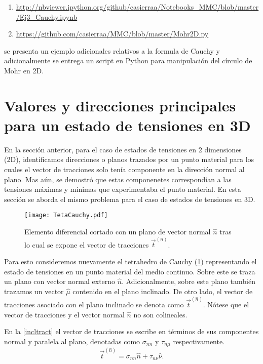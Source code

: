 \documentclass[../notas medios.tex]{subfiles}
\begin{document}
\begin{enumerate} 
\item {\url{http://nbviewer.ipython.org/github/casierraa/Notebooks_MMC/blob/master/Ej3_Cauchy.ipynb}}

\item  {\url{https://github.com/casierraa/MMC/blob/master/Mohr2D.py}} 
\end{enumerate}

se presenta un ejemplo adicionales relativos a la formula de Cauchy y  adicionalmente se entrega un script en Python para manipulación del círculo de Mohr en 2D.

\section{Valores y direcciones principales para un estado de tensiones en 3D}
En la sección anterior, para el caso de estados de tensiones en 2 dimensiones (2D), identificamos direcciones o planos trazados por un punto material para los cuales el vector de tracciones solo tenía componente en la dirección normal al plano. Mas aún, se demostró que estas componenetes correspondían a las tensiones máximas y mínimas que experimentaba el punto material. En esta sección se aborda el mismo problema para el caso de estados de tensiones en 3D.  
%
\begin{figure}[H]
\centering
	\texttt{[image: TetaCauchy.pdf]}
	\caption{Elemento diferencial cortado con un plano de vector normal $\hat{n}$ tras lo cual se expone el vector de tracciones ${{\vec t}^{(n)}}$.}
	\label{TetaCauchy}
\end{figure}

Para esto consideremos nuevamente el tetrahedro de Cauchy (\cref{TetaCauchy}) representando el estado de tensiones en un punto material del medio continuo. Sobre este se traza un plano con vector normal externo $\hat{n}$. Adicionalmente, sobre este plano también trazamos un vector ${\hat \mu }$ contenido en el plano inclinado. De otro lado, el vector de tracciones asociado con el plano inclinado se denota como ${\vec t^{(\hat n)}}$. Nótese que el vector de tracciones y el vector normal $\hat{n}$ no son colineales.

En la \cref{incltract} el vector de tracciones se escribe en términos de sus componentes normal y paralela al plano, denotadas como ${\sigma _{nn}}$ y ${\tau _{n\mu }}$ respectivamente.
%
\begin{equation}
{{\vec t}^{(\hat n)}} = {\sigma _{nn}}\hat n + {\tau _{n\nu }}\hat \nu.
\label{incltract}
\end{equation}
\end{document}
